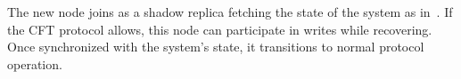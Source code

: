     
     The new node joins as a shadow replica fetching the state of the system as in~\cite{10.1145/2815400.2815425, 10.1145/2043556.2043560}. If the CFT protocol allows, this node can participate in writes while recovering. Once synchronized with the system's state, it transitions to normal protocol operation. %



